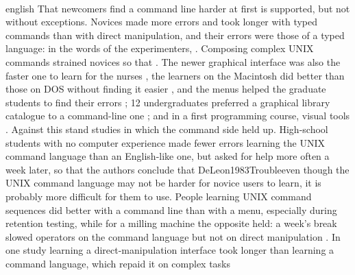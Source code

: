 \paragraph{} %
\begin{onlyin}{english} %
That newcomers find a command line harder at first is supported, but
not without exceptions.  Novices made more errors and took longer with
typed commands than with direct manipulation, and their errors were
those of a typed language: in the words of the experimenters,
.  Composing complex UNIX commands strained novices so that
.
The newer graphical interface was also the faster one to learn for the
nurses \autocite{Staggers2000Comparing}, the learners on the Macintosh
did better than those on DOS without finding it easier
\autocite{Davis1993Training}, and the menus helped the graduate
students to find their errors \autocite{Schultz1998Effects}; 12
undergraduates preferred a graphical library catalogue to a
command-line one \autocite{Meadows2011Graphical}; and in a first
programming course, visual tools .  Against this stand
studies in which the command side held up.  High-school students with
no computer experience made fewer errors learning the UNIX command
language than an English-like one, but asked for help more often a
week later, so that the authors conclude that \textcquote
{DeLeon1983Trouble}{even though the UNIX command language may not be
harder for novice users to learn, it is probably more difficult for
them to use}.  People learning UNIX command sequences did better with a
command line than with a menu, 
{especially during retention testing}, while for a milling machine the
opposite held: a week's break slowed operators on the command language
but not on direct manipulation \autocite{TorresChazaro1992Comparison}.
In one study learning a direct-manipulation interface took longer than
learning a command language, which repaid it on complex tasks

\end{onlyin}

